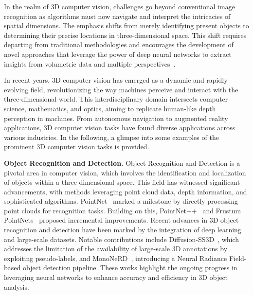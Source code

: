 In the realm of 3D computer vision, challenges go beyond conventional image recognition as algorithms must now navigate and interpret the intricacies of spatial dimensions. The emphasis shifts from merely identifying present objects to determining their precise locations in three-dimensional space. This shift requires departing from traditional methodologies and encourages the development of novel approaches that leverage the power of deep neural networks to extract insights from volumetric data and multiple perspectives~\citep{maturana2015voxnet, qi2017pointnet, li2018pointcnn}.

In recent years, 3D computer vision has emerged as a dynamic and rapidly evolving field, revolutionizing the way machines perceive and interact with the three-dimensional world. This interdisciplinary domain intersects computer science, mathematics, and optics, aiming to replicate human-like depth perception in machines. From autonomous navigation to augmented reality applications, 3D computer vision tasks have found diverse applications across various industries. In the following, a glimpse into some examples of the prominent 3D computer vision tasks is provided.

\vspace{1ex}
\noindent\textbf{Object Recognition and Detection.} Object Recognition and Detection is a pivotal area in computer vision, which involves the identification and localization of objects within a three-dimensional space. This field has witnessed significant advancements, with methods leveraging point cloud data, depth information, and sophisticated algorithms. PointNet~\citep{qi2017pointnet} marked a milestone by directly processing point clouds for recognition tasks. Building on this, PointNet++~\citep{qi2017pointnet++} and Frustum PointNets~\citep{qi2018frustum} proposed incremental improvements. Recent advances in 3D object recognition and detection have been marked by the integration of deep learning and large-scale datasets. Notable contributions include Diffusion-SS3D~\citep{ho2023diffusion}, which addresses the limitation of the availability of large-scale 3D annotations by exploiting pseudo-labels, and MonoNeRD~\citep{xu2023mononerd}, introducing a Neural Radiance Field-based object detection pipeline. These works highlight the ongoing progress in leveraging neural networks to enhance accuracy and efficiency in 3D object analysis.

